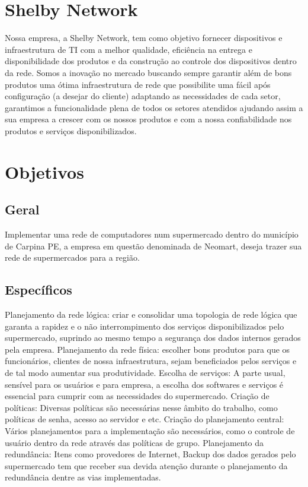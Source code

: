 \documentclass[12pt]{article}
\begin{document}
\section{Shelby Network}
Nossa empresa, a Shelby Network, tem como objetivo fornecer dispositivos e infraestrutura de TI com a melhor qualidade, eficiência na entrega e disponibilidade dos produtos e da construção ao controle dos dispositivos dentro da rede. Somos a inovação no mercado buscando sempre garantir além de bons produtos uma ótima infraestrutura de rede que possibilite uma fácil após configuração (a desejar do cliente) adaptando as necessidades de cada setor, garantimos a funcionalidade plena de todos os setores atendidos ajudando assim a sua empresa a crescer com os nossos produtos e com a nossa confiabilidade nos produtos e serviços disponibilizados.
\section{Objetivos}
\subsection{Geral}
Implementar uma rede de computadores num supermercado dentro do município de Carpina PE, a empresa em questão denominada de Neomart, deseja trazer sua rede de supermercados para a região.
\subsection{Específicos}
Planejamento da rede lógica: criar e consolidar uma topologia de rede lógica que garanta a rapidez e o não interrompimento dos serviços disponibilizados pelo supermercado, suprindo ao mesmo tempo a segurança dos dados internos gerados pela empresa.
Planejamento da rede física: escolher bons produtos para que os funcionários, clientes de nossa infraestrutura, sejam beneficiados pelos serviços e de tal modo aumentar sua produtividade.
Escolha de serviços: A parte usual, sensível para os usuários e para empresa, a escolha dos softwares e serviços é essencial para cumprir com as necessidades do supermercado.
Criação de políticas: Diversas políticas são necessárias nesse âmbito do trabalho, como políticas de senha, acesso ao servidor e etc.
Criação do planejamento central: Vários planejamentos para a implementação são necessários, como o controle de usuário dentro da rede através das políticas de grupo.
Planejamento da redundância: Itens como provedores de Internet, Backup dos dados gerados pelo supermercado tem que receber sua devida atenção durante o planejamento da redundância dentre as vias implementadas.
\end{document}
